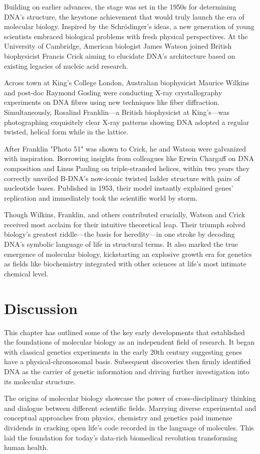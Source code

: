 Building on earlier advances, the stage was set in the 1950s for determining DNA's structure, the keystone achievement that would truly launch the era of molecular biology. Inspired by the Schrödinger's ideas, a new generation of young scientists embraced biological problems with fresh physical perspectives. At the University of Cambridge, American biologist James Watson joined British biophysicist Francis Crick aiming to elucidate DNA's architecture based on existing legacies of nucleic acid research.

Across town at King's College London, Australian biophysicist Maurice Wilkins and post-doc Raymond Gosling were conducting X-ray crystallography experiments on DNA fibres using new techniques like fiber diffraction. Simultaneously, Rosalind Franklin---a British biophysicist at King's---was photographing exquisitely clear X-ray patterns showing DNA adopted a regular twisted, helical form while in the lattice.

After Franklin "Photo 51" was shown to Crick, he and Watson were galvanized with inspiration. Borrowing insights from colleagues like Erwin Chargaff on DNA composition and Linus Pauling on triple-stranded helices, within two years they correctly unveiled B-DNA's now-iconic twisted ladder structure with pairs of nucleotide bases. Published in 1953, their model instantly explained genes' replication and immediately took the scientific world by storm.

Though Wilkins, Franklin, and others contributed crucially, Watson and Crick received most acclaim for their intuitive theoretical leap. Their triumph solved biology's greatest riddle---the basis for heredity---in one stroke by decoding DNA's symbolic language of life in structural terms. It also marked the true emergence of molecular biology, kickstarting an explosive growth era for genetics as fields like biochemistry integrated with other sciences at life's most intimate chemical level.

\section{Discussion}

This chapter has outlined some of the key early developments that established the foundations of molecular biology as an independent field of research. It began with classical genetics experiments in the early 20th century suggesting genes have a physical-chromosomal basis. Subsequent discoveries then firmly identified DNA as the carrier of genetic information and driving further investigation into its molecular structure.

The origins of molecular biology showcase the power of cross-disciplinary thinking and dialogue between different scientific fields. Marrying diverse experimental and conceptual approaches from physics, chemistry and genetics paid immense dividends in cracking open life's code recorded in the language of molecules. This laid the foundation for today's data-rich biomedical revolution transforming human health.